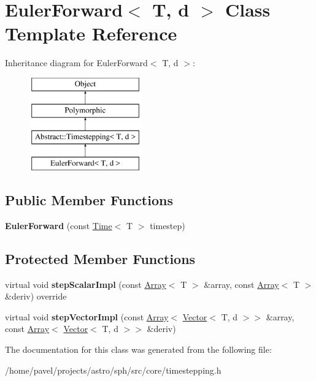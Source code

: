 \hypertarget{classEulerForward}{}\section{Euler\+Forward$<$ T, d $>$ Class Template Reference}
\label{classEulerForward}
Inheritance diagram for Euler\+Forward$<$ T, d $>$\+:\begin{figure}[H]
\begin{center}
\leavevmode
\includegraphics[height=4.000000cm]{classEulerForward}
\end{center}
\end{figure}
\subsection*{Public Member Functions}
\begin{DoxyCompactItemize}
\item 
\hypertarget{classEulerForward_a1fa0c2f52cbdbee5780060db11a041fa}{}\label{classEulerForward_a1fa0c2f52cbdbee5780060db11a041fa} 
{\bfseries Euler\+Forward} (const \hyperlink{classBaseUnit}{Time}$<$ T $>$ timestep)
\end{DoxyCompactItemize}
\subsection*{Protected Member Functions}
\begin{DoxyCompactItemize}
\item 
\hypertarget{classEulerForward_a76b07fb1ba1fb59b655836393752b32e}{}\label{classEulerForward_a76b07fb1ba1fb59b655836393752b32e} 
virtual void {\bfseries step\+Scalar\+Impl} (const \hyperlink{classArray}{Array}$<$ T $>$ \&array, const \hyperlink{classArray}{Array}$<$ T $>$ \&deriv) override
\item 
\hypertarget{classEulerForward_a65ca387ae43609dc9a158c1c247a3346}{}\label{classEulerForward_a65ca387ae43609dc9a158c1c247a3346} 
virtual void {\bfseries step\+Vector\+Impl} (const \hyperlink{classArray}{Array}$<$ \hyperlink{classVector}{Vector}$<$ T, d $>$$>$ \&array, const \hyperlink{classArray}{Array}$<$ \hyperlink{classVector}{Vector}$<$ T, d $>$$>$ \&deriv)
\end{DoxyCompactItemize}


The documentation for this class was generated from the following file\+:\begin{DoxyCompactItemize}
\item 
/home/pavel/projects/astro/sph/src/core/timestepping.\+h\end{DoxyCompactItemize}
